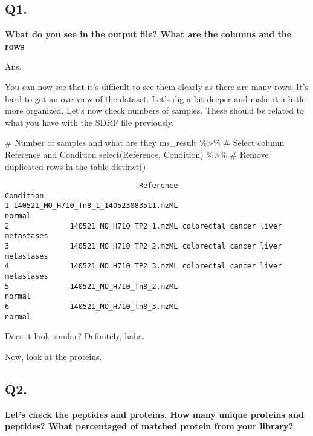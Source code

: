 \documentclass[
  letterpaper,
  DIV=11,
  numbers=noendperiod]{scrartcl}
\newenvironment{Shaded}{\begin{snugshade}}{\end{snugshade}}
\newcommand{\CommentTok}[1]{\textcolor[rgb]{0.37,0.37,0.37}{#1}}
\newcommand{\FunctionTok}[1]{\textcolor[rgb]{0.28,0.35,0.67}{#1}}
\newcommand{\NormalTok}[1]{\textcolor[rgb]{0.00,0.23,0.31}{#1}}
\newcommand{\SpecialCharTok}[1]{\textcolor[rgb]{0.37,0.37,0.37}{#1}}
\begin{document}
\subsection{Q1.}\label{q1.}

\textbf{What do you see in the output file? What are the columns and the
rows}

Ans.

You can now see that it's difficult to see them clearly as there are
many rows. It's hard to get an overview of the dataset. Let's dig a bit
deeper and make it a little more organized. Let's now check numbers of
samples. These should be related to what you have with the SDRF file
previously.

\begin{Shaded}
\begin{Highlighting}[]
\CommentTok{\# Number of samples and what are they}
\NormalTok{ms\_result }\SpecialCharTok{\%\textgreater{}\%} 
  \CommentTok{\# Select column Reference and Condition}
  \FunctionTok{select}\NormalTok{(Reference, Condition) }\SpecialCharTok{\%\textgreater{}\%} 
  \CommentTok{\# Remove duplicated rows in the table}
  \FunctionTok{distinct}\NormalTok{()}
\end{Highlighting}
\end{Shaded}

\begin{verbatim}
                               Reference                          Condition
1 140521_MO_H710_Tn8_1_140523083511.mzML                             normal
2              140521_MO_H710_TP2_1.mzML colorectal cancer liver metastases
3              140521_MO_H710_TP2_2.mzML colorectal cancer liver metastases
4              140521_MO_H710_TP2_3.mzML colorectal cancer liver metastases
5              140521_MO_H710_Tn8_2.mzML                             normal
6              140521_MO_H710_Tn8_3.mzML                             normal
\end{verbatim}

Does it look similar? Definitely, haha.

Now, look at the proteins.

\subsection{Q2.}\label{q2.}

\textbf{Let's check the peptides and proteins. How many unique proteins
and peptides? What percentaged of matched protein from your library?}
\end{document}
